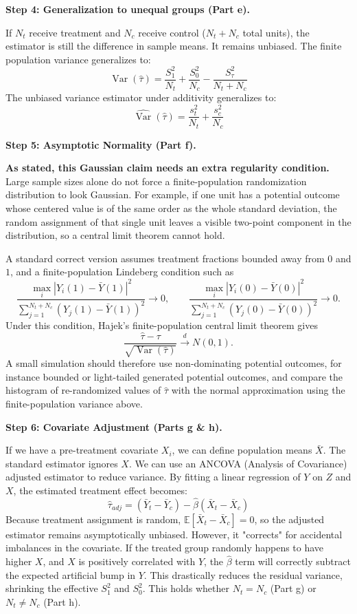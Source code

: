 \begin{solution}
\textbf{Step 4: Generalization to unequal groups (Part e).}

If $N_t$ receive treatment and $N_c$ receive control ($N_t + N_c$ total units), the estimator is still the difference in sample means. It remains unbiased.
The finite population variance generalizes to:
\[ \operatorname{Var}(\hat{\tau}) = \frac{S_1^2}{N_t} + \frac{S_0^2}{N_c} - \frac{S_\tau^2}{N_t + N_c} \]
The unbiased variance estimator under additivity generalizes to:
\[ \widehat{\operatorname{Var}}(\hat{\tau}) = \frac{s_t^2}{N_t} + \frac{s_c^2}{N_c} \]

\textbf{Step 5: Asymptotic Normality (Part f).}

\textbf{As stated, this Gaussian claim needs an extra regularity condition.}
Large sample sizes alone do not force a finite-population randomization distribution to
look Gaussian. For example, if one unit has a potential outcome whose centered value is
of the same order as the whole standard deviation, the random assignment of that single
unit leaves a visible two-point component in the distribution, so a central limit theorem
cannot hold.

A standard correct version assumes treatment fractions bounded away from $0$ and $1$,
and a finite-population Lindeberg condition such as
\[
\frac{\max_i |Y_i(1)-\bar Y(1)|^2}{\sum_{j=1}^{N_t+N_c}(Y_j(1)-\bar Y(1))^2}\to 0,
\qquad
\frac{\max_i |Y_i(0)-\bar Y(0)|^2}{\sum_{j=1}^{N_t+N_c}(Y_j(0)-\bar Y(0))^2}\to 0.
\]
Under this condition, Hajek's finite-population central limit theorem gives
\[
\frac{\hat{\tau}-\tau}{\sqrt{\operatorname{Var}(\hat{\tau})}}
\xrightarrow{d} N(0,1).
\]
A small simulation should therefore use non-dominating potential outcomes, for instance
bounded or light-tailed generated potential outcomes, and compare the histogram of
re-randomized values of $\hat\tau$ with the normal approximation using the finite-population
variance above.

\textbf{Step 6: Covariate Adjustment (Parts g \& h).}

If we have a pre-treatment covariate $X_i$, we can define population means $\bar{X}$. The standard estimator ignores $X$.
We can use an ANCOVA (Analysis of Covariance) adjusted estimator to reduce variance. By fitting a linear regression of $Y$ on $Z$ and $X$, the estimated treatment effect becomes:
\[ \hat{\tau}_{adj} = (\bar{Y}_t - \bar{Y}_c) - \hat{\beta} (\bar{X}_t - \bar{X}_c) \]
Because treatment assignment is random, $\mathbb{E}[\bar{X}_t - \bar{X}_c] = 0$, so the adjusted estimator remains asymptotically unbiased.
However, it "corrects" for accidental imbalances in the covariate. If the treated group randomly happens to have higher $X$, and $X$ is positively correlated with $Y$, the $\hat{\beta}$ term will correctly subtract the expected artificial bump in $Y$.
This drastically reduces the residual variance, shrinking the effective $S_1^2$ and $S_0^2$. This holds whether $N_t = N_c$ (Part g) or $N_t \neq N_c$ (Part h).
\end{solution}

